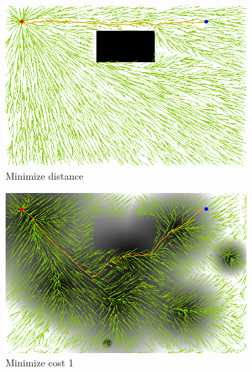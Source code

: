\documentclass{article}
\begin{document}
\begin{figure}[h!]
	\centering
	\begin{subfigure}[b]{0.35\linewidth}
		\centering
		\includegraphics[width=\textwidth]{fig/sim4-obstacle/MORRTstar01-1-0.png}
		\caption{Minimize distance}
		\label{fig:sim:obs:distance}
	\end{subfigure}
	\begin{subfigure}[b]{0.35\linewidth}
		\centering
		\includegraphics[width=\textwidth]{fig/sim4-obstacle/MORRTstar01-1-1.png}
		\caption{Minimize cost 1}
		\label{fig:sim:obs:fitness1}
	\end{subfigure}  \\
	\begin{subfigure}[b]{0.35\linewidth}
		\centering

\end{subfigure}
\end{figure}
\end{document}

